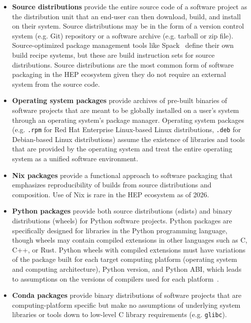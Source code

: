\begin{itemize}
    \item \textbf{Source distributions} provide the entire source code of a software project as the distribution unit that an end-user can then download, build, and install on their system.
    Source distributions may be in the form of a version control system (e.g. Git) repository or a software archive (e.g. tarball or zip file).
    Source-optimized package management tools like Spack~\cite{Spack_2015} define their own build recipe systems, but these are build instruction sets for source distributions.
    Source distributions are the most common form of software packaging in the HEP ecosystem given they do not require an external system from the source code.
    \item \textbf{Operating system packages} provide archives of pre-built binaries of software projects that are meant to be globally installed on a user's system through an operating system's package manager.
    Operating system packages (e.g. \texttt{.rpm} for Red Hat Enterprise Linux-based Linux distributions, \texttt{.deb} for Debian-based Linux distributions) assume the existence of libraries and tools that are provided by the operating system and treat the entire operating system as a unified software environment.
    \item \textbf{Nix packages} provide a functional approach to software packaging that emphasizes reproducibility of builds from source distributions and composition.
    Use of Nix is rare in the HEP ecosystem as of 2026.
    \item \textbf{Python packages} provide both source distributions (sdists) and binary distributions (wheels) for Python software projects.
    Python packages are specifically designed for libraries in the Python programming language, though wheels may contain compiled extensions in other languages such as C, C++, or Rust.
    Python wheels with compiled extensions must have variations of the package built for each target computing platform (operating system and computing architecture), Python version, and Python ABI, which leads to assumptions on the versions of compilers used for each platform~\cite{pypackaging-native}.
    \item \textbf{Conda packages} provide binary distributions of software projects that are computing-platform specific but make no assumptions of underlying system libraries or tools down to low-level C library requirements (e.g. \texttt{glibc}).
\end{itemize}


